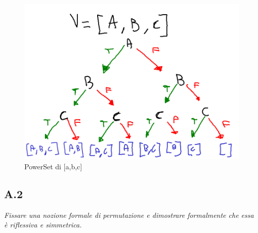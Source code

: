 \documentclass[a4paper]{article}
\begin{document}
\begin{figure}[!ht]
\centering
\includegraphics[scale = 0.8]{./img/A1_2.png}
\caption{PowerSet di [a,b,c]} \label{FIG:PowerSet}
\end{figure}
\newpage
\subsection{A.2}
\emph{Fissare una nozione formale di permutazione e dimostrare formalmente che essa è riflessiva e simmetrica.}
\end{document}
